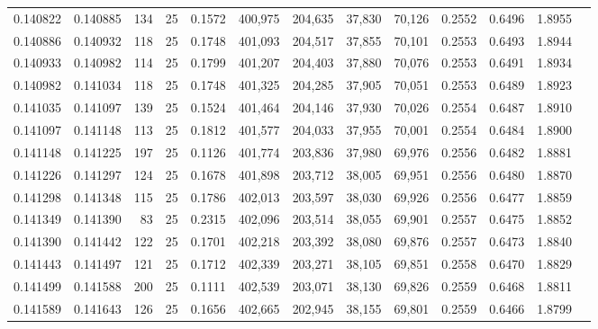 \begin{tabular}{rrrrrrrrrrrrr}
0.140822 & 0.140885 &   134 &  25 &                                     0.1572 & 400,975 & 204,635 &  37,830 &  70,126 & 0.2552 & 0.6496 & 1.8955 \\
0.140886 & 0.140932 &   118 &  25 &                                     0.1748 & 401,093 & 204,517 &  37,855 &  70,101 & 0.2553 & 0.6493 & 1.8944 \\
0.140933 & 0.140982 &   114 &  25 &                                     0.1799 & 401,207 & 204,403 &  37,880 &  70,076 & 0.2553 & 0.6491 & 1.8934 \\
0.140982 & 0.141034 &   118 &  25 &                                     0.1748 & 401,325 & 204,285 &  37,905 &  70,051 & 0.2553 & 0.6489 & 1.8923 \\
0.141035 & 0.141097 &   139 &  25 &                                     0.1524 & 401,464 & 204,146 &  37,930 &  70,026 & 0.2554 & 0.6487 & 1.8910 \\
0.141097 & 0.141148 &   113 &  25 &                                     0.1812 & 401,577 & 204,033 &  37,955 &  70,001 & 0.2554 & 0.6484 & 1.8900 \\
0.141148 & 0.141225 &   197 &  25 &                                     0.1126 & 401,774 & 203,836 &  37,980 &  69,976 & 0.2556 & 0.6482 & 1.8881 \\
0.141226 & 0.141297 &   124 &  25 &                                     0.1678 & 401,898 & 203,712 &  38,005 &  69,951 & 0.2556 & 0.6480 & 1.8870 \\
0.141298 & 0.141348 &   115 &  25 &                                     0.1786 & 402,013 & 203,597 &  38,030 &  69,926 & 0.2556 & 0.6477 & 1.8859 \\
0.141349 & 0.141390 &    83 &  25 &                                     0.2315 & 402,096 & 203,514 &  38,055 &  69,901 & 0.2557 & 0.6475 & 1.8852 \\
0.141390 & 0.141442 &   122 &  25 &                                     0.1701 & 402,218 & 203,392 &  38,080 &  69,876 & 0.2557 & 0.6473 & 1.8840 \\
0.141443 & 0.141497 &   121 &  25 &                                     0.1712 & 402,339 & 203,271 &  38,105 &  69,851 & 0.2558 & 0.6470 & 1.8829 \\
0.141499 & 0.141588 &   200 &  25 &                                     0.1111 & 402,539 & 203,071 &  38,130 &  69,826 & 0.2559 & 0.6468 & 1.8811 \\
0.141589 & 0.141643 &   126 &  25 &                                     0.1656 & 402,665 & 202,945 &  38,155 &  69,801 & 0.2559 & 0.6466 & 1.8799 \\

\end{tabular}
